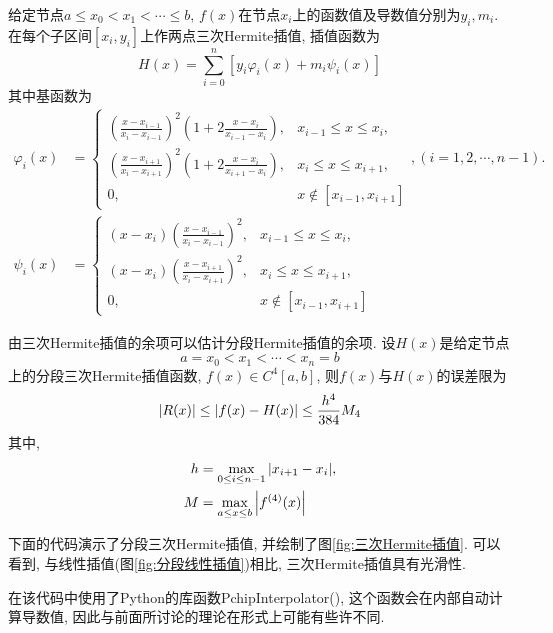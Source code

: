 给定节点$a\le x_0<x_1<\cdots\le b$, $f(x)$在节点$x_i$上的函数值及导数值分别为$y_i,m_i$. 在每个子区间$[x_i,y_i]$上作两点三次Hermite插值, 插值函数为
\begin{equation}\label{eqn:2.7.6}
    H(x)=\sum_{i=0}^n\left[y_i\varphi_i(x)+m_i\psi_i(x)\right]
\end{equation}
其中基函数为
\begin{align*}
    \varphi_i(x)&=
    \begin{cases}
        \left(\frac{x-x_{i-1}}{x_i-x_{i-1}}\right)^2\left(1+2\frac{x-x_i}{x_{i-1}-x_i}\right),&x_{i-1}\le x\le x_i,\\
        \left(\frac{x-x_{i+1}}{x_i-x_{i+1}}\right)^2\left(1+2\frac{x-x_i}{x_{i+1}-x_i}\right),&x_i\le x\le x_{i+1},\\
        0,&x\notin[x_{i-1},x_{i+1}]
    \end{cases}, (i=1,2,\cdots,n-1).\\
    \psi_i(x)&=
    \begin{cases}
        (x-x_i)\left(\frac{x-x_{i-1}}{x_i-x_{i-1}}\right)^2,&x_{i-1}\le x\le x_i,\\
        (x-x_i)\left(\frac{x-x_{i+1}}{x_i-x_{i+1}}\right)^2,&x_{i}\le x\le x_{i+1},\\
        0,&x\notin[x_{i-1},x_{i+1}]
    \end{cases}
\end{align*}

由三次Hermite插值的余项可以估计分段Hermite插值的余项. 设$H(x)$是给定节点
\begin{equation*}
    a=x_0<x_1<\cdots<x_n=b
\end{equation*}
上的分段三次Hermite插值函数, $f(x)\in C^4[a,b]$, 则$f(x)$与$H(x)$的误差限为
\begin{equation*}
    \abs{R(x)}\le\abs{f(x)-H(x)}\le\frac{h^4}{384}M_4
\end{equation*}
其中,
\begin{align*}
    h&=\max_{0\le i\le n-1}\abs{x_{i+1}-x_i},\\
    M&=\max_{a\le x\le b}\abs{f^{(4)}(x)}
\end{align*}

下面的代码演示了分段三次Hermite插值, 并绘制了图\ref{fig:三次Hermite插值}. 可以看到, 与线性插值(图\ref{fig:分段线性插值})相比, 三次Hermite插值具有光滑性.

\begin{extend}
    在该代码中使用了Python的库函数PchipInterpolator(), 这个函数会在内部自动计算导数值, 因此与前面所讨论的理论在形式上可能有些许不同.
\end{extend}

